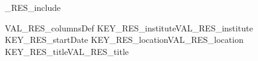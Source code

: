 
%
\ifVAL_RES_include %
\begin{myTableEnv}{VAL_RES_columnsDef}
    \myRow
        {KEY_RES_institute}{VAL_RES_institute}
        {KEY_RES_startDate}{}
    \myRow
        {KEY_RES_location}{VAL_RES_location}
        {KEY_RES_title}{VAL_RES_title}
\end{myTableEnv}
%
\fi
%